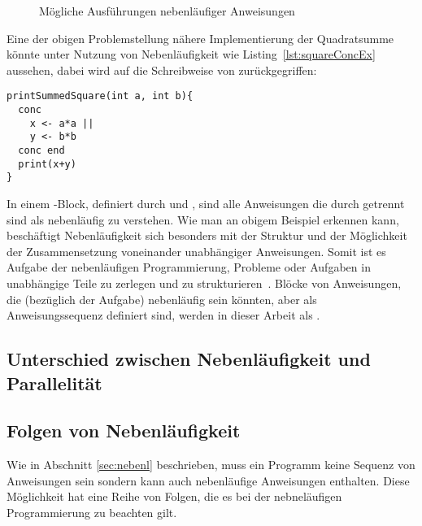 \documentclass[12pt,a4paper,listof=totocnumbered,parskip=half]{scrreprt}
\begin{document}
\begin{figure}[hbt]
\begin{subfigure}{\textwidth}
\begin{tikzpicture}
\end{tikzpicture}
\end{subfigure}

\caption{Mögliche Ausführungen nebenläufiger Anweisungen}\label{fig:concAnweisungen}
\end{figure}

Eine der obigen Problemstellung nähere Implementierung der Quadratsumme könnte unter Nutzung von Nebenläufigkeit wie Listing~\ref{lst:squareConcEx} aussehen, dabei wird auf die Schreibweise von \textcite{Herrtwich1989} zurückgegriffen:
\begin{lstlisting}[caption={Beispiel eines Programms mit nebenläufigem Code in einem \code{conc}-Block. Das Programm gibt die Summe von zwei Quadratzahlen aus, wobei die Berechnung der Quadratzahlen nebenläufig stattfindet.}, label={lst:squareConcEx}]
printSummedSquare(int a, int b){
  conc 
    x <- a*a ||
    y <- b*b
  conc end
  print(x+y)
}
\end{lstlisting}
In einem -Block, definiert durch  und , sind alle Anweisungen die durch \code{||} getrennt sind als nebenläufig zu verstehen. Wie man an obigem Beispiel erkennen kann, beschäftigt Nebenläufigkeit sich besonders mit der Struktur und der Möglichkeit der Zusammensetzung voneinander unabhängiger Anweisungen. Somit ist es Aufgabe der nebenläufigen Programmierung, Probleme oder Aufgaben in unabhängige Teile zu zerlegen und zu strukturieren~\cite{Pike2012,Hettel2016}. Blöcke von Anweisungen, die (bezüglich der Aufgabe) nebenläufig sein könnten, aber als Anweisungssequenz definiert sind, werden in dieser Arbeit als . 

\subsection{Unterschied zwischen Nebenläufigkeit und Parallelität}

\subsection{Folgen von Nebenläufigkeit}
Wie in Abschnitt \ref{sec:nebenl} beschrieben, muss ein Programm keine Sequenz von Anweisungen sein sondern kann auch nebenläufige Anweisungen enthalten. Diese Möglichkeit hat eine Reihe von Folgen, die es bei der nebneläufigen Programmierung zu beachten gilt.
\end{document}
